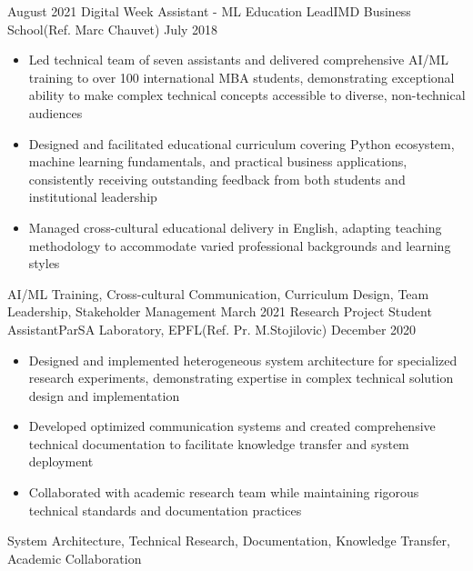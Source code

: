 \begin{experiences}
  \experience
    {August 2021}   {Digital Week Assistant - ML Education Lead}{IMD Business School}{(Ref. Marc Chauvet)}
    {July 2018} {
                      \begin{itemize}
                        \item Led technical team of seven assistants and delivered comprehensive AI/ML training to over 100 international MBA students, demonstrating exceptional ability to make complex technical concepts accessible to diverse, non-technical audiences
                        \item Designed and facilitated educational curriculum covering Python ecosystem, machine learning fundamentals, and practical business applications, consistently receiving outstanding feedback from both students and institutional leadership
                        \item Managed cross-cultural educational delivery in English, adapting teaching methodology to accommodate varied professional backgrounds and learning styles
                      \end{itemize}
                    }
                    {AI/ML Training, Cross-cultural Communication, Curriculum Design, Team Leadership, Stakeholder Management}
  \emptySeparator
  \experience
    {March 2021}   {Research Project Student Assistant}{ParSA Laboratory, EPFL}{(Ref. Pr. M.Stojilovic)}
    {December 2020} {
                      \begin{itemize}
                        \item Designed and implemented heterogeneous system architecture for specialized research experiments, demonstrating expertise in complex technical solution design and implementation
                        \item Developed optimized communication systems and created comprehensive technical documentation to facilitate knowledge transfer and system deployment
                        \item Collaborated with academic research team while maintaining rigorous technical standards and documentation practices
                      \end{itemize}
                    }
                    {System Architecture, Technical Research, Documentation, Knowledge Transfer, Academic Collaboration}
  \emptySeparator
\end{experiences}
